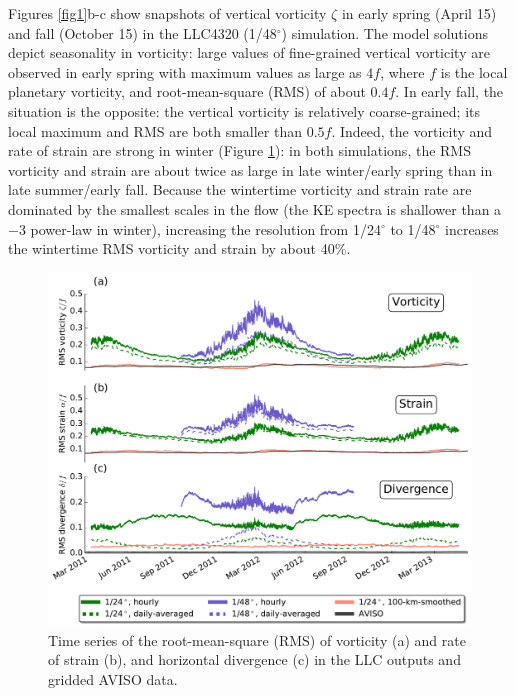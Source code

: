 \documentclass[grl]{agutex2015}
\begin{document}
\begin{article}
Figures \ref{fig1}b-c show snapshots of vertical vorticity $\zeta$ in early spring
(April 15) and fall (October 15) in the LLC4320 (1/48$^\circ$) simulation.
The model solutions depict seasonality in vorticity: large values of
fine-grained vertical vorticity are observed in early spring with maximum
values as large as $4f$, where $f$ is
the local planetary vorticity, and root-mean-square (RMS) of about $0.4f$. In early
fall, the situation is the opposite: the vertical vorticity is relatively coarse-grained;
its local maximum and RMS are both smaller than $0.5f$.
Indeed, the vorticity and rate of strain are strong in winter (Figure \ref{fig2}):
in both simulations, the RMS vorticity and strain are about twice as large in
late winter/early spring
than in late summer/early fall. Because the wintertime vorticity and strain rate
are dominated by the smallest scales in the flow (the KE spectra is shallower than
a $-3$ power-law in winter), increasing the resolution from
1/24$^\circ$ to 1/48$^\circ$ increases the wintertime RMS vorticity
and strain by about 40$\%$.

 \begin{figure}[ht]
   \begin{center}
     \includegraphics[width=.75\textwidth]{figs/fig2.pdf}
  \caption{Time series of the root-mean-square (RMS) of vorticity (a) and
  rate of strain (b), and horizontal divergence (c) in the LLC outputs and gridded AVISO data.}
  \label{fig2}
  \end{center}
\end{figure}


\end{article}
\end{document}
